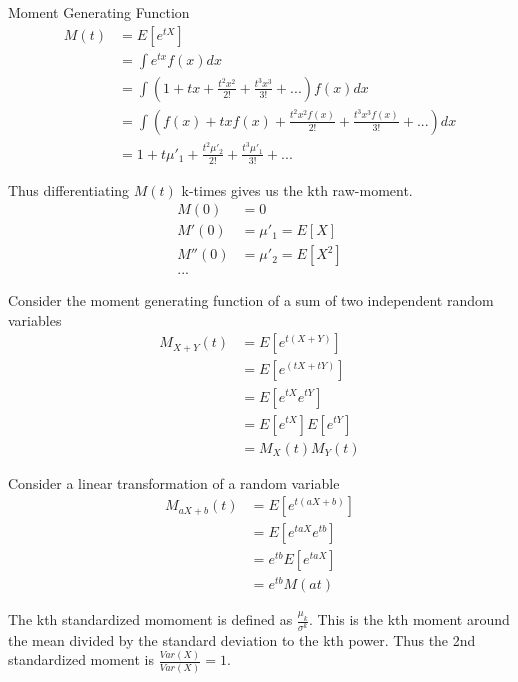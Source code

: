 \documentclass{article}
\begin{document}
Moment Generating Function
\begin{align*}
  M(t)&=E[e^{tX}] \\
  &= \int e^{tx}f(x)dx \\
  &= \int (1+tx+\frac{t^2x^2}{2!}+\frac{t^3x^3}{3!}+...)f(x)dx \\
  &= \int (f(x) +txf(x)+\frac{t^2x^2f(x)}{2!}+\frac{t^3x^3f(x)}{3!}+...)dx \\
  &= 1 +t\mu'_1+\frac{t^2\mu'_2}{2!}+\frac{t^3\mu'_1}{3!}+...
\end{align*}

Thus differentiating $M(t)$ k-times gives us the kth raw-moment.
\begin{align*}
  M(0)&=0\\
  M'(0)&=\mu'_1=E[X]\\
  M''(0)&=\mu'_2=E[X^2]\\
  ...
\end{align*}

Consider the moment generating function of a sum of two independent random variables
\begin{align*}
  M_{X+Y}(t)&=E[e^{t(X+Y)}]\\
  &=E[e^{(tX+tY)}]\\
  &=E[e^{tX}e^{tY}]\\
  &=E[e^{tX}]E[e^{tY}]\\
  &=M_X(t)M_Y(t)
\end{align*}

Consider a linear transformation of a random variable 
\begin{align*}
  M_{aX+b}(t)&=E[e^{t(aX+b)}]\\
  &=E[e^{taX}e^{tb}]\\
  &=e^{tb}E[e^{taX}]\\
  &=e^{tb}M(at)
\end{align*}

The kth standardized momoment is defined as $\displaystyle \frac{\mu_k}{\sigma^k}$.
This is the kth moment around the mean divided by the standard deviation to the
kth power. Thus the 2nd standardized moment is $\displaystyle \frac{Var(X)}{Var(X)}=1$.



\end{document}
